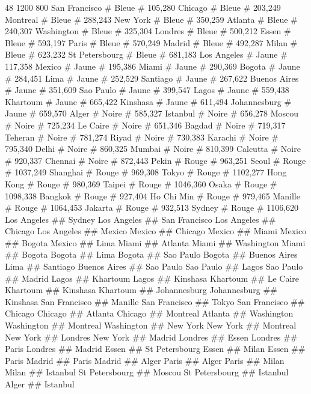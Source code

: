 48
1200 800
San Francisco	#	Bleue	# 	{ 105,280 }
Chicago			#	Bleue	#	{ 203,249 }
Montreal		#	Bleue	#	{ 288,243 }
New York		#	Bleue	#	{ 350,259 }
Atlanta			#	Bleue	#	{ 240,307 }
Washington		#	Bleue	#	{ 325,304 }
Londres			#	Bleue	#	{ 500,212 }
Essen			#	Bleue	#	{ 593,197 }
Paris			#	Bleue	#	{ 570,249 }
Madrid			#	Bleue	#	{ 492,287 }
Milan			#	Bleue	#	{ 623,232 }
St Petersbourg	# 	Bleue	#	{ 681,183 }
Los Angeles		#	Jaune	#	{ 117,358 }
Mexico			#	Jaune	#	{ 195,386 }
Miami			#	Jaune	#	{ 290,369 }
Bogota			#	Jaune	#	{ 284,451 }
Lima			#	Jaune	#	{ 252,529 }
Santiago		#	Jaune	#	{ 267,622 }
Buenos Aires	#	Jaune	#	{ 351,609 }
Sao Paulo		#	Jaune	#	{ 399,547 }
Lagos			#	Jaune	#	{ 559,438 }
Khartoum		#	Jaune	#	{ 665,422 }
Kinshasa		#	Jaune	#	{ 611,494 }
Johannesburg	#	Jaune	#	{ 659,570 }
Alger			# 	Noire	#	{ 585,327 }
Istanbul		# 	Noire	#	{ 656,278 }
Moscou			# 	Noire	#	{ 725,234 }
Le Caire		# 	Noire	#	{ 651,346 }
Bagdad			# 	Noire	#	{ 719,317 }
Teheran			# 	Noire	#	{ 781,274 }
Riyad			# 	Noire	#	{ 730,383 }
Karachi			# 	Noire	#	{ 795,340 }
Delhi			# 	Noire	#	{ 860,325 }
Mumbai			# 	Noire	#	{ 810,399 }
Calcutta		# 	Noire	#	{ 920,337 }
Chennai			# 	Noire	#	{ 872,443 }
Pekin			#	Rouge	#	{ 963,251 }
Seoul			#	Rouge	#	{ 1037,249 }
Shanghai		#	Rouge	#	{ 969,308 }
Tokyo			#	Rouge	#	{ 1102,277 }
Hong Kong		#	Rouge	#	{ 980,369 }
Taipei			#	Rouge	#	{ 1046,360 }
Osaka			#	Rouge	#	{ 1098,338 }
Bangkok			#	Rouge	#	{ 927,404 }
Ho Chi Min		#	Rouge	#	{ 979,465 }
Manille			#	Rouge	#	{ 1064,453 }
Jakarta			#	Rouge	#	{ 932,513 }
Sydney			#	Rouge	#	{ 1106,620 }
Los Angeles		##	Sydney
Los Angeles		##	San Francisco
Los Angeles		##	Chicago
Los Angeles		##	Mexico
Mexico			##	Chicago
Mexico			##	Miami
Mexico			##	Bogota
Mexico			##	Lima
Miami			##	Atlanta
Miami			##	Washington
Miami			##	Bogota
Bogota			##	Lima
Bogota			##	Sao Paulo
Bogota			##	Buenos Aires
Lima			##	Santiago
Buenos Aires	##	Sao Paulo
Sao Paulo		##	Lagos
Sao Paulo		##	Madrid
Lagos			##	Khartoum
Lagos			##	Kinshasa
Khartoum		##	Le Caire
Khartoum		##	Kinshasa
Khartoum		##	Johannesburg
Johannesburg	##	Kinshasa
San Francisco	##	Manille
San Francisco	##	Tokyo
San Francisco	##	Chicago
Chicago			##	Atlanta
Chicago			##	Montreal
Atlanta			## 	Washington
Washington		## 	Montreal
Washington		## 	New York
New York		##	Montreal
New York		##	Londres
New York		##	Madrid
Londres			##	Essen
Londres			##	Paris
Londres			##	Madrid
Essen			##	St Petersbourg
Essen			##	Milan
Essen			##	Paris
Madrid			##	Paris
Madrid			##	Alger
Paris			##	Alger
Paris			##	Milan
Milan			##	Istanbul
St Petersbourg	##	Moscou
St Petersbourg	##	Istanbul
Alger	##	Istanbul
